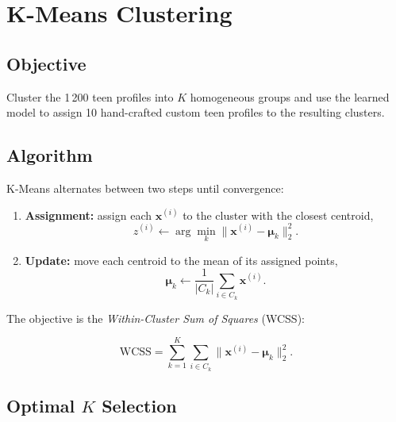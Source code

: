 \documentclass[11pt,a4paper]{article}
\begin{document}
\newpage
\section{K-Means Clustering}

\subsection{Objective}
Cluster the 1\,200 teen profiles into $K$ homogeneous groups and use the
learned model to assign 10 hand-crafted custom teen profiles to the
resulting clusters.

\subsection{Algorithm}

K-Means alternates between two steps until convergence:

\begin{enumerate}[leftmargin=*, itemsep=2pt]
    \item \textbf{Assignment:} assign each $\mathbf{x}^{(i)}$ to the cluster
        with the closest centroid,
        \begin{equation}
            z^{(i)} \leftarrow \arg\min_{k} \bigl\| \mathbf{x}^{(i)} - \boldsymbol{\mu}_k \bigr\|_2^{2}.
        \end{equation}
    \item \textbf{Update:} move each centroid to the mean of its assigned
        points,
        \begin{equation}
            \boldsymbol{\mu}_k \leftarrow \frac{1}{|C_k|} \sum_{i \in C_k} \mathbf{x}^{(i)}.
        \end{equation}
\end{enumerate}

The objective is the \emph{Within-Cluster Sum of Squares} (WCSS):

\begin{equation}
    \text{WCSS} = \sum_{k=1}^{K} \sum_{i \in C_k} \bigl\| \mathbf{x}^{(i)} - \boldsymbol{\mu}_k \bigr\|_2^{2}.
\end{equation}

\subsection{Optimal $K$ Selection}
\end{document}
